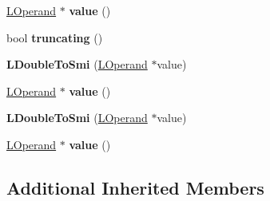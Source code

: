 \begin{DoxyCompactItemize}
\item 
\hyperlink{classv8_1_1internal_1_1_l_operand}{L\+Operand} $\ast$ {\bfseries value} ()\hypertarget{classv8_1_1internal_1_1_l_double_to_smi_a4789ff131d1eb1d48331dbbd7585700f}{}\label{classv8_1_1internal_1_1_l_double_to_smi_a4789ff131d1eb1d48331dbbd7585700f}

\item 
bool {\bfseries truncating} ()\hypertarget{classv8_1_1internal_1_1_l_double_to_smi_aaba8610aa536afcd9001d714fce3346a}{}\label{classv8_1_1internal_1_1_l_double_to_smi_aaba8610aa536afcd9001d714fce3346a}

\item 
{\bfseries L\+Double\+To\+Smi} (\hyperlink{classv8_1_1internal_1_1_l_operand}{L\+Operand} $\ast$value)\hypertarget{classv8_1_1internal_1_1_l_double_to_smi_ade132e87e9375570afdbf683622dde87}{}\label{classv8_1_1internal_1_1_l_double_to_smi_ade132e87e9375570afdbf683622dde87}

\item 
\hyperlink{classv8_1_1internal_1_1_l_operand}{L\+Operand} $\ast$ {\bfseries value} ()\hypertarget{classv8_1_1internal_1_1_l_double_to_smi_a4789ff131d1eb1d48331dbbd7585700f}{}\label{classv8_1_1internal_1_1_l_double_to_smi_a4789ff131d1eb1d48331dbbd7585700f}

\item 
{\bfseries L\+Double\+To\+Smi} (\hyperlink{classv8_1_1internal_1_1_l_operand}{L\+Operand} $\ast$value)\hypertarget{classv8_1_1internal_1_1_l_double_to_smi_ade132e87e9375570afdbf683622dde87}{}\label{classv8_1_1internal_1_1_l_double_to_smi_ade132e87e9375570afdbf683622dde87}

\item 
\hyperlink{classv8_1_1internal_1_1_l_operand}{L\+Operand} $\ast$ {\bfseries value} ()\hypertarget{classv8_1_1internal_1_1_l_double_to_smi_a4789ff131d1eb1d48331dbbd7585700f}{}\label{classv8_1_1internal_1_1_l_double_to_smi_a4789ff131d1eb1d48331dbbd7585700f}

\end{DoxyCompactItemize}
\subsection*{Additional Inherited Members}


